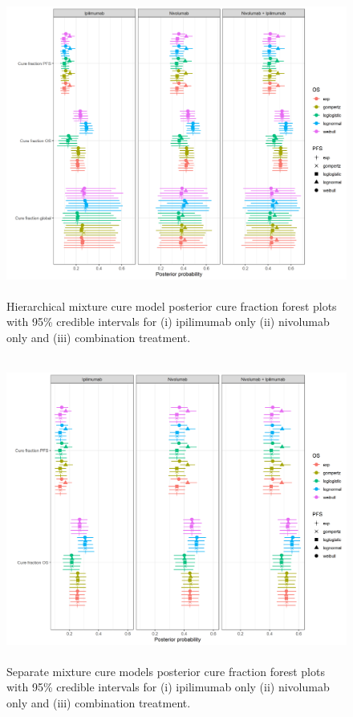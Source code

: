 \documentclass[AMA,STIX1COL]{WileyNJD-v2}
\begin{document}
\begin{figure}
\centering
\includegraphics[height=10cm, width=0.9\linewidth]{forest_plot_joint_cf_hier.png}
\caption{\label{fig:cf_forest_all_tx} Hierarchical mixture cure model posterior cure fraction forest plots with 95\% credible intervals for (i) ipilimumab only (ii) nivolumab only and (iii) combination treatment.}
\end{figure}

\begin{figure}
\centering
\includegraphics[height=10cm, width=0.9\linewidth]{forest_plot_joint_all_tx_separate.png}
\caption{\label{fig:cf_forest_all_tx_sep} Separate mixture cure models posterior cure fraction forest plots with 95\% credible intervals for (i) ipilimumab only (ii) nivolumab only and (iii) combination treatment.}
\end{figure}
\end{document}
